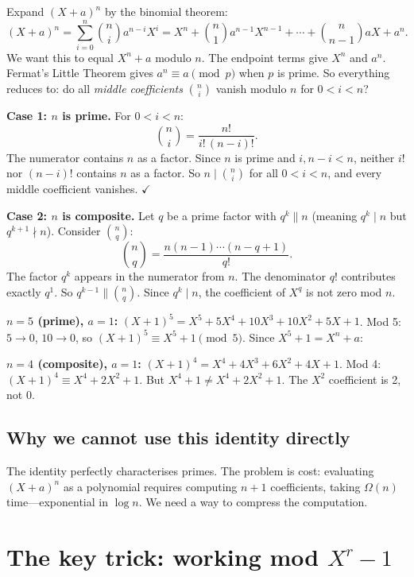 \documentclass[12pt]{article}
\newcommand{\xmark}{\ding{55}}
\begin{document}
Expand $(X+a)^n$ by the binomial theorem:
\[
  (X+a)^n = \sum_{i=0}^{n}\binom{n}{i}a^{n-i}X^i
  = X^n + \binom{n}{1}a^{n-1}X^{n-1}+\cdots+\binom{n}{n-1}aX + a^n.
\]
We want this to equal $X^n + a$ modulo $n$. The endpoint terms give $X^n$ and $a^n$. Fermat's Little Theorem gives $a^n \equiv a \pmod{p}$ when $p$ is prime. So everything reduces to: do all \emph{middle coefficients} $\binom{n}{i}$ vanish modulo $n$ for $0 < i < n$?

\textbf{Case 1: $n$ is prime.} For $0 < i < n$:
\[
  \binom{n}{i} = \frac{n!}{i!\,(n-i)!}.
\]
The numerator contains $n$ as a factor. Since $n$ is prime and $i,n-i < n$, neither $i!$ nor $(n-i)!$ contains $n$ as a factor. So $n \mid \binom{n}{i}$ for all $0<i<n$, and every middle coefficient vanishes. $\checkmark$

\textbf{Case 2: $n$ is composite.} Let $q$ be a prime factor with $q^k \| n$ (meaning $q^k\mid n$ but $q^{k+1}\nmid n$). Consider $\binom{n}{q}$:
\[
  \binom{n}{q} = \frac{n(n-1)\cdots(n-q+1)}{q!}.
\]
The factor $q^k$ appears in the numerator from $n$. The denominator $q!$ contributes exactly $q^1$. So $q^{k-1} \| \binom{n}{q}$. Since $q^k \mid n$, the coefficient of $X^q$ is not zero mod $n$. \xmark

\begin{exbox}
\textbf{$n=5$ (prime), $a=1$:}
$(X+1)^5 = X^5 + 5X^4+10X^3+10X^2+5X+1$.
Mod 5: $5\to 0$, $10\to 0$, so $(X+1)^5 \equiv X^5+1 \pmod{5}$. Since $X^5+1 = X^n+a$: \checkmark

\medskip\textbf{$n=4$ (composite), $a=1$:}
$(X+1)^4 = X^4+4X^3+6X^2+4X+1$.
Mod 4: $(X+1)^4 \equiv X^4+2X^2+1$.
But $X^4+1 \neq X^4+2X^2+1$. The $X^2$ coefficient is 2, not 0. \xmark
\end{exbox}

\subsection{Why we cannot use this identity directly}

The identity perfectly characterises primes. The problem is cost: evaluating $(X+a)^n$ as a polynomial requires computing $n+1$ coefficients, taking $\Omega(n)$ time---exponential in $\log n$. We need a way to compress the computation.

\section{The key trick: working mod $X^r - 1$}
\end{document}
